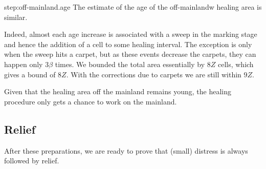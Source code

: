 \documentclass[12pt]{memoir}
\newcommand{\Z}{Z}
\begin{document}
\begin{Proof}
\begin{step+}{step:off-mainland.age}
The estimate of the age of the off-mainlandw healing area is similar.
\end{step+}
\begin{prooof}
Indeed, almost each age increase is associated with a sweep in the marking stage
and hence the addition of a cell to some healing interval.
The exception is only when the sweep hits a carpet, but as these events
decrease the carpets, they can happen only \( 3\beta \) times.
We bounded the total area essentially by \( 8\Z \) cells, which gives a bound
of \( 8\Z \).
With the corrections due to carpets we are still within \( 9\Z \).
\end{prooof} %

\end{Proof} %

Given that the healing area off the mainland remains young,
the healing procedure only gets a chance to work on the mainland.






\subsection{Relief}

After these preparations, we are ready to prove that (small) distress is always followed
by relief.
\end{document}

